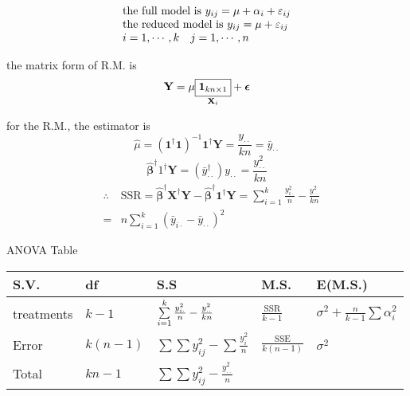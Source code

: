 \documentclass{article}
\begin{document}
\begin{equation*}
\begin{tabular}{l}
the full model is $y_{ij}=\mu +\alpha _{i}+\varepsilon _{ij}$ \\ 
the reduced model is $y_{ij}=\mu +\varepsilon _{ij}$ \\ 
$i=1,\cdots ,k\quad j=1,\cdots ,n$%
\end{tabular}%
\end{equation*}

the matrix form of R.M. is%
\begin{equation*}
\mathbf{Y}=\mu \underset{\mathbf{X}_{i}}{\fbox{$\mathbf{1}_{kn\times 1}$}}+%
\mathbf{\epsilon }
\end{equation*}

for the R.M., the estimator is%
\begin{equation*}
\hat{\mu}=\left( \mathbf{1}^{\dagger }\mathbf{1}\right) ^{-1}\mathbf{1}%
^{\dagger }\mathbf{Y}=\frac{y_{\cdot \cdot }}{kn}=\bar{y}_{\cdot \cdot }
\end{equation*}%
\begin{equation*}
\mathbf{\hat{\beta}}^{\dagger }1^{\dagger }\mathbf{Y=}\left( \bar{y}_{\cdot
\cdot }^{\dagger }\right) y_{\cdot \cdot }=\frac{y_{\cdot \cdot }^{2}}{kn}
\end{equation*}%
\begin{eqnarray*}
&\therefore &\text{SSR}=\mathbf{\hat{\beta}}^{\dagger }\mathbf{X}^{\dagger }%
\mathbf{Y-\hat{\beta}}^{\dagger }\mathbf{1}^{\dagger }\mathbf{Y=}%
\sum\limits_{i=1}^{k}\frac{y_{i\cdot }^{2}}{n}-\frac{y_{\cdot \cdot }^{2}}{kn%
} \\
&=&n\sum\limits_{i=1}^{k}\left( \bar{y}_{i\cdot }-\bar{y}_{\cdot \cdot
}\right) ^{2}
\end{eqnarray*}

\bigskip

ANOVA Table

\bigskip

\begin{tabular}{lllll}
S.V. & df & S.S & M.S. & E(M.S.) \\ \hline
treatments & $k-1$ & $\sum\limits_{i=1}^{k}\frac{y_{i\cdot }^{2}}{n}-\frac{%
y_{\cdot \cdot }^{2}}{kn}$ & $\frac{\text{SSR}}{k-1}$ & $\sigma ^{2}+\frac{n%
}{k-1}\sum \alpha _{i}^{2}$ \\ 
Error & $k\left( n-1\right) $ & $\sum \sum y_{ij}^{2}-\sum \frac{y_{i}^{2}}{n%
}$ & $\frac{\text{SSE}}{k\left( n-1\right) }$ & $\sigma ^{2}$ \\ 
Total & $kn-1$ & $\sum \sum y_{ij}^{2}-\frac{y_{\cdot \cdot }^{2}}{n}$ &  & 
\end{tabular}
\end{document}
